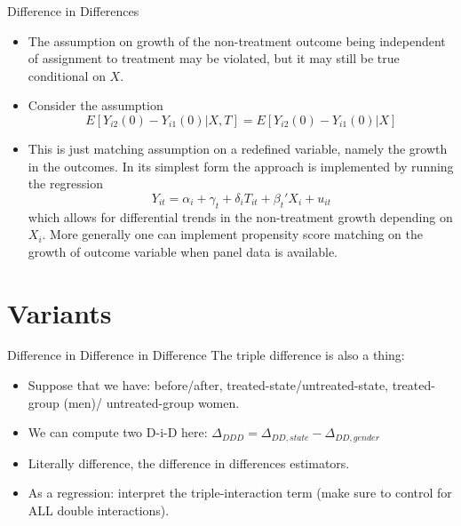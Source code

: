 \begin{frame}{Difference in Differences}
\begin{itemize}
\item The assumption on growth of the non-treatment outcome being independent of assignment to treatment may be violated, but it may still be true conditional on $X$.
\item Consider the assumption
$$ E[Y_{i2}(0)- Y_{i1}(0) | X,T] = E[Y_{i2}(0)- Y_{i1}(0) | X] $$ 
\item This is just matching assumption on a redefined variable, namely the growth in the outcomes. In its simplest form the approach is implemented by running the regression
$$ Y_{it} = \alpha_i + \gamma_t + \delta_i T_{it} + \beta_t' X_i + u_{it}$$ 
which allows for differential trends in the non-treatment growth depending on $X_i$. More generally one can implement propensity score matching on the growth of outcome variable when panel data is available.
\end{itemize}
\end{frame}

\section{Variants}

\begin{frame}{Difference in Difference in Difference}
The triple difference is also a thing:
\begin{itemize}
\item Suppose that we have: before/after, treated-state/untreated-state, treated-group (men)/ untreated-group women.
\item We can compute two D-i-D here: $\Delta_{DDD} = \Delta_{DD,state} - \Delta_{DD,gender}$ 
\item Literally difference, the difference in differences estimators.
\item As a regression: interpret the triple-interaction term (make sure to control for ALL double interactions).
\end{itemize}
\end{frame}


